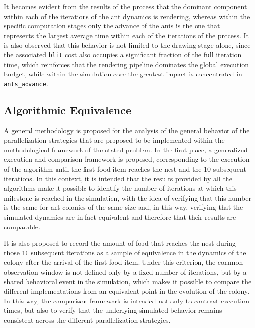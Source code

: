 It becomes evident from the results of the process that the dominant component within each of the iterations of the ant dynamics is rendering, whereas within the specific computation stages only the advance of the ants is the one that represents the largest average time within each of the iterations of the process. It is also observed that this behavior is not limited to the drawing stage alone, since the associated \texttt{blit} cost also occupies a significant fraction of the full iteration time, which reinforces that the rendering pipeline dominates the global execution budget, while within the simulation core the greatest impact is concentrated in \texttt{ants\_advance}.

\subsection{Algorithmic Equivalence}
A general methodology is proposed for the analysis of the general behavior of the parallelization strategies that are proposed to be implemented within the methodological framework of the stated problem. In the first place, a generalized execution and comparison framework is proposed, corresponding to the execution of the algorithm until the first food item reaches the nest and the 10 subsequent iterations. In this context, it is intended that the results provided by all the algorithms make it possible to identify the number of iterations at which this milestone is reached in the simulation, with the idea of verifying that this number is the same for ant colonies of the same size and, in this way, verifying that the simulated dynamics are in fact equivalent and therefore that their results are comparable.

It is also proposed to record the amount of food that reaches the nest during those 10 subsequent iterations as a sample of equivalence in the dynamics of the colony after the arrival of the first food item. Under this criterion, the common observation window is not defined only by a fixed number of iterations, but by a shared behavioral event in the simulation, which makes it possible to compare the different implementations from an equivalent point in the evolution of the colony. In this way, the comparison framework is intended not only to contrast execution times, but also to verify that the underlying simulated behavior remains consistent across the different parallelization strategies.
